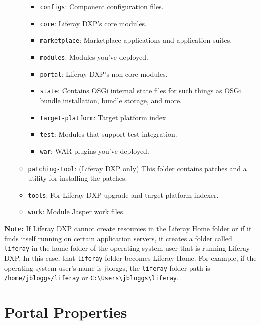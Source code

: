 \begin{itemize}
\begin{itemize}
    \begin{itemize}
    \tightlist
    \item
      \texttt{configs}: Component configuration files.
    \item
      \texttt{core}: Liferay DXP's core modules.
    \item
      \texttt{marketplace}: Marketplace applications and application
      suites.
    \item
      \texttt{modules}: Modules you've deployed.
    \item
      \texttt{portal}: Liferay DXP's non-core modules.
    \item
      \texttt{state}: Contains OSGi internal state files for such things
      as OSGi bundle installation, bundle storage, and more.
    \item
      \texttt{target-platform}: Target platform index.
    \item
      \texttt{test}: Modules that support test integration.
    \item
      \texttt{war}: WAR plugins you've deployed.
    \end{itemize}
  \item
    \texttt{patching-tool}: (Liferay DXP only) This folder contains
    patches and a utility for installing the patches.
  \item
    \texttt{tools}: For Liferay DXP upgrade and target platform indexer.
  \item
    \texttt{work}: Module Jasper work files.
  \end{itemize}
\end{itemize}

\noindent\hrulefill

\textbf{Note:} If Liferay DXP cannot create resources in the Liferay
Home folder or if it finds itself running on certain application
servers, it creates a folder called \texttt{liferay} in the home folder
of the operating system user that is running Liferay DXP. In this case,
that \texttt{liferay} folder becomes Liferay Home. For example, if the
operating system user's name is jbloggs, the \texttt{liferay} folder
path is \texttt{/home/jbloggs/liferay} or
\texttt{C:\textbackslash{}Users\textbackslash{}jbloggs\textbackslash{}liferay}.

\chapter{Portal Properties}\label{portal-properties-1}

